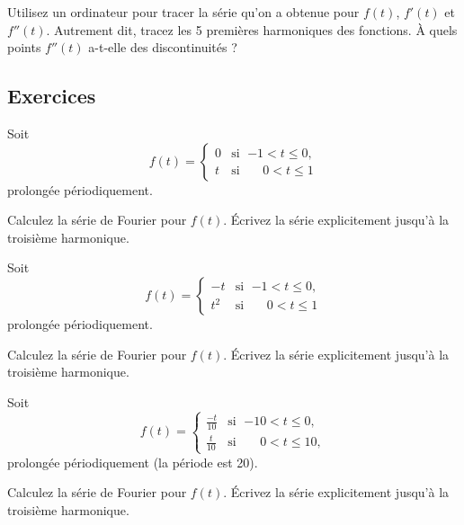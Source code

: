 \begin{exercise}
Utilisez un ordinateur pour tracer la série qu'on a obtenue pour $f(t)$, $f'(t)$ et
$f''(t)$.  Autrement dit, tracez les 5 premières harmoniques des fonctions. À quels
 points  $f''(t)$ a-t-elle des discontinuités ?
\end{exercise}

\subsection{Exercices}

\begin{exercise}
Soit
\begin{equation*}
f(t) =
\begin{cases}
0 & \text{si } \; {-1} < t \leq 0 , \\
t & \text{si } \; \phantom{-}0 < t \leq  1 
\end{cases}
\end{equation*}
prolongée périodiquement.
\begin{tasks}
\task Calculez la série de Fourier pour $f(t)$.
\task Écrivez la série explicitement jusqu'à la troisième harmonique.
\end{tasks}
\end{exercise}

\begin{exercise}
Soit
\begin{equation*}
f(t) =
\begin{cases}
-t & \text{si } \; {-1} < t \leq 0 , \\
t^2 & \text{si } \; \phantom{-}0 < t \leq  1 
\end{cases}
\end{equation*}
prolongée périodiquement.

\begin{tasks}
\task Calculez la série de Fourier pour $f(t)$.
\task Écrivez la série explicitement jusqu'à la troisième harmonique.
\end{tasks}
\end{exercise}

\begin{exercise}
Soit
\begin{equation*}
f(t) =
\begin{cases}
\frac{-t}{10} & \text{si } \; {-10} < t \leq 0 , \\
\frac{t}{10} & \text{si } \; \phantom{-1}0 < t \leq  10 ,
\end{cases}
\end{equation*}
prolongée périodiquement (la période est 20).
\begin{tasks}
\task Calculez la série de Fourier pour $f(t)$.
\task Écrivez la série explicitement jusqu'à la troisième harmonique.
\end{tasks}
\end{exercise}

